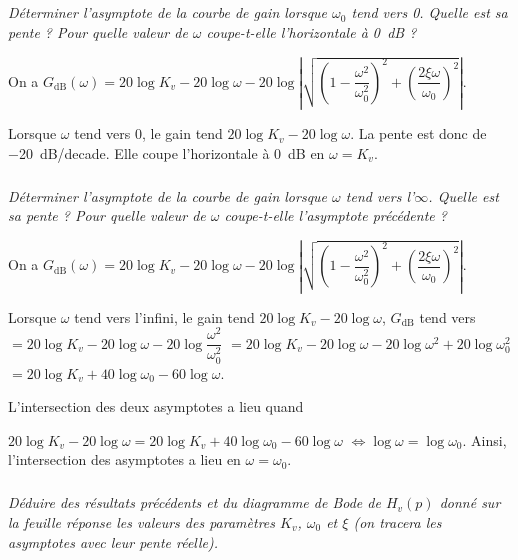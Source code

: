 \documentclass[10pt,fleqn]{article} %
\begin{document}
\begin{multicols}{2}
\subparagraph{}\textit{Déterminer l'asymptote de la courbe de gain lorsque 
$\omega_0$ tend vers 0. Quelle est sa pente ?
Pour quelle valeur de $\omega$ coupe-t-elle l'horizontale à \SI{0}{dB} ?}

\ifprof \begin{corrige}
On a $G_{\text{dB}}\left(\omega \right)
=20\log K_v- 20\log  \omega - 20\log  \left| \sqrt{\left(1- \dfrac{\omega^2}{\omega_0^2} \right)^2+\left( \dfrac{2\xi\omega }{\omega_0} \right)^2} \right|$. 

Lorsque $\omega$ tend vers 0, le gain tend $20\log K_v- 20\log  \omega$.
 La pente est donc de \SI{-20}{dB/decade}. Elle coupe l'horizontale à \SI{0}{dB} en $\omega=K_v$.

\end{corrige} \else \fi

\subparagraph{}\textit{Déterminer l'asymptote de la courbe de gain lorsque $\omega$ tend vers l'$\infty$. Quelle est sa pente ?	
Pour quelle valeur de $\omega$ coupe-t-elle l'asymptote précédente ?}


\ifprof \begin{corrige}
On a $G_{\text{dB}}\left(\omega \right)
=20\log K_v- 20\log  \omega - 20\log  \left| \sqrt{\left(1- \dfrac{\omega^2}{\omega_0^2} \right)^2+\left( \dfrac{2\xi\omega }{\omega_0} \right)^2} \right|$. 

Lorsque $\omega$ tend vers l'infini, le gain tend $20\log K_v- 20\log  \omega$, 
$G_{\text{dB}}$ tend vers 
$= 20\log K_v- 20\log  \omega - 20\log  \dfrac{\omega^2}{\omega_0^2} $
$= 20\log K_v- 20\log  \omega - 20\log  \omega^2 +20\log  \omega_0^2 $
$= 20\log K_v+ 40\log  \omega_0 - 60\log  \omega $.

L'intersection des deux asymptotes a lieu quand 

$20\log K_v- 20\log  \omega= 20\log K_v+40\log  \omega_0 - 60\log  \omega$
$\Leftrightarrow \log  \omega= \log  \omega_0 $. Ainsi, l'intersection des asymptotes a lieu en $\omega=\omega_0$. 
\end{corrige} \else \fi

\subparagraph{}\textit{Déduire des résultats précédents et du diagramme de Bode de $H_v(p)$ donné sur la feuille réponse les valeurs des paramètres $K_v$, $\omega_0$ et $\xi$ (on tracera les asymptotes avec leur pente réelle).}

\ifprof \begin{corrige}~\\


\end{corrige}
\end{multicols}
\end{document}
